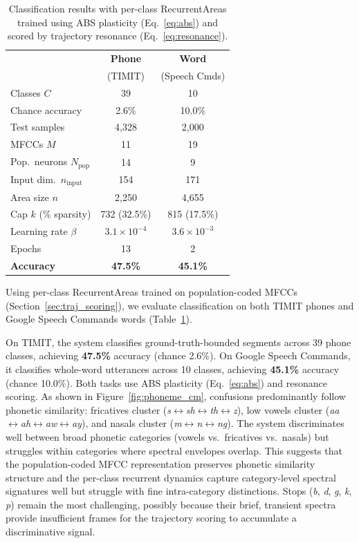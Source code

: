 \begin{table}[t]
\caption{Classification results with per-class RecurrentAreas trained using ABS plasticity (Eq.~\ref{eq:abs}) and scored by trajectory resonance (Eq.~\ref{eq:resonance}).}
\vspace{-10pt}
\label{tab:classification}
\centering
\small
\begin{tabular}{@{}lcc@{}}
\toprule
 & \textbf{Phone} & \textbf{Word} \\
 & (TIMIT) & (Speech Cmds) \\
\midrule
Classes $C$ & 39 & 10 \\
Chance accuracy & 2.6\% & 10.0\% \\
Test samples & 4{,}328 & 2{,}000 \\
\midrule
MFCCs $M$ & 11 & 19 \\
Pop.\ neurons $N_\mathrm{pop}$ & 14 & 9 \\
Input dim.\ $n_\mathrm{input}$ & 154 & 171 \\
Area size $n$ & 2{,}250 & 4{,}655 \\
Cap $k$ (\% sparsity) & 732 (32.5\%) & 815 (17.5\%) \\
Learning rate $\beta$ & $3.1{\times}10^{-4}$ & $3.6{\times}10^{-3}$ \\
Epochs & 13 & 2 \\
\midrule
\textbf{Accuracy} & \textbf{47.5\%} & \textbf{45.1\%} \\
\bottomrule
\end{tabular}
\vspace{-10pt}
\end{table}

Using per-class RecurrentAreas trained on population-coded MFCCs (Section~\ref{sec:traj_scoring}), we evaluate classification on both TIMIT phones and Google Speech Commands words (Table~\ref{tab:classification}).

On TIMIT, the system classifies ground-truth-bounded segments across 39 phone classes, achieving \textbf{47.5\%} accuracy (chance 2.6\%). On Google Speech Commands, it classifies whole-word utterances across 10 classes, achieving \textbf{45.1\%} accuracy (chance 10.0\%). Both tasks use ABS plasticity (Eq.~\eqref{eq:abs}) and resonance scoring. As shown in Figure~\ref{fig:phoneme_cm}, confusions predominantly follow phonetic similarity: fricatives cluster (\textit{s}$\leftrightarrow$\textit{sh}$\leftrightarrow$\textit{th}$\leftrightarrow$\textit{z}), low vowels cluster (\textit{aa}$\leftrightarrow$\textit{ah}$\leftrightarrow$\textit{aw}$\leftrightarrow$\textit{ay}), and nasals cluster (\textit{m}$\leftrightarrow$\textit{n}$\leftrightarrow$\textit{ng}). The system discriminates well between broad phonetic categories (vowels vs.\ fricatives vs.\ nasals) but struggles within categories where spectral envelopes overlap. This suggests that the population-coded MFCC representation preserves phonetic similarity structure and the per-class recurrent dynamics capture category-level spectral signatures well but struggle with fine intra-category distinctions. Stops (\textit{b}, \textit{d}, \textit{g}, \textit{k}, \textit{p}) remain the most challenging, possibly because their brief, transient spectra provide insufficient frames for the trajectory scoring to accumulate a discriminative signal.

